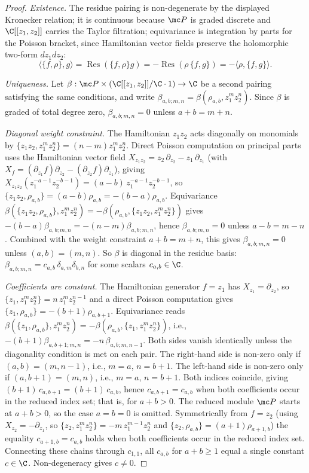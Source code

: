 \documentclass[11pt]{memoir}
\begin{document}
\begin{proof}
  \emph{Existence.} The residue pairing is non-degenerate by the displayed
  Kronecker relation; it is continuous because $\mc P$ is graded discrete
  and $\C[[z_1,z_2]]$ carries the Taylor filtration; equivariance is
  integration by parts for the Poisson bracket, since Hamiltonian vector
  fields preserve the holomorphic two-form $dz_1dz_2$:
  $$\langle\{f,\rho\},g\rangle
    =\operatorname{Res}(\{f,\rho\}g)
    =-\operatorname{Res}(\rho\,\{f,g\})
    =-\langle\rho,\{f,g\}\rangle.$$

  \emph{Uniqueness.} Let
  $\beta:\mc P\times(\C[[z_1,z_2]]/\C\cdot1)\to\C$ be a second pairing
  satisfying the same conditions, and write
  $\beta_{a,b;m,n}=\beta(\rho_{a,b},z_1^mz_2^n)$. Since $\beta$ is graded
  of total degree zero, $\beta_{a,b;m,n}=0$ unless $a+b=m+n$.

  \emph{Diagonal weight constraint.} The Hamiltonian $z_1z_2$ acts
  diagonally on monomials by
  $\{z_1z_2,z_1^mz_2^n\}=(n-m)z_1^mz_2^n$. Direct Poisson computation on
  principal parts uses the Hamiltonian vector field
  $X_{z_1z_2}=z_2\,\partial_{z_2}-z_1\,\partial_{z_1}$
  (with $X_f=(\partial_{z_1}f)\partial_{z_2}-(\partial_{z_2}f)\partial_{z_1}$),
  giving
  $X_{z_1z_2}(z_1^{-a-1}z_2^{-b-1})=(a-b)\,z_1^{-a-1}z_2^{-b-1}$, so
  $\{z_1z_2,\rho_{a,b}\}=(a-b)\rho_{a,b}=-(b-a)\rho_{a,b}$. Equivariance
  $\beta(\{z_1z_2,\rho_{a,b}\},z_1^mz_2^n)
   =-\beta(\rho_{a,b},\{z_1z_2,z_1^mz_2^n\})$ gives
  $-(b-a)\beta_{a,b;m,n}=-(n-m)\beta_{a,b;m,n}$,
  hence $\beta_{a,b;m,n}=0$ unless $a-b=m-n$. Combined with the weight
  constraint $a+b=m+n$, this gives $\beta_{a,b;m,n}=0$ unless
  $(a,b)=(m,n)$. So $\beta$ is diagonal in the residue basis:
  $\beta_{a,b;m,n}=c_{a,b}\,\delta_{a,m}\delta_{b,n}$ for some scalars
  $c_{a,b}\in\C$.

  \emph{Coefficients are constant.} The Hamiltonian generator $f=z_1$ has
  $X_{z_1}=\partial_{z_2}$, so $\{z_1,z_1^mz_2^n\}=n\,z_1^mz_2^{n-1}$ and
  a direct Poisson computation gives
  $\{z_1,\rho_{a,b}\}=-(b+1)\rho_{a,b+1}$. Equivariance reads
  $\beta(\{z_1,\rho_{a,b}\},z_1^mz_2^n)
   =-\beta(\rho_{a,b},\{z_1,z_1^mz_2^n\})$, i.e.,
  $-(b+1)\beta_{a,b+1;m,n}=-n\,\beta_{a,b;m,n-1}$.
  Both sides vanish identically unless the diagonality condition is met
  on each pair. The right-hand side is non-zero only if $(a,b)=(m,n-1)$,
  i.e., $m=a$, $n=b+1$. The left-hand side is non-zero only if
  $(a,b+1)=(m,n)$, i.e., $m=a$, $n=b+1$.  Both indices coincide,
  giving $(b+1)\,c_{a,b+1}=(b+1)\,c_{a,b}$, hence $c_{a,b+1}=c_{a,b}$ when
  both coefficients occur in the reduced index set; that is, for
  \(a+b>0\).  The reduced module \(\mc P\) starts at \(a+b>0\), so
  the case \(a=b=0\) is omitted.
  Symmetrically from $f=z_2$ (using
  $X_{z_2}=-\partial_{z_1}$, so
  $\{z_2,z_1^mz_2^n\}=-m\,z_1^{m-1}z_2^n$ and
  $\{z_2,\rho_{a,b}\}=(a+1)\rho_{a+1,b}$) the equality $c_{a+1,b}=c_{a,b}$ holds when
  both coefficients occur in the reduced index set. Connecting these
  chains through \(c_{1,1}\), all $c_{a,b}$ for $a+b\ge1$ equal a single
  constant $c\in\C$. Non-degeneracy gives $c\neq0$.


\end{proof}
\end{document}
